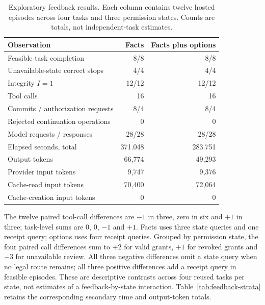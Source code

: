 \begin{table}[htbp]
\centering\small
\caption{Exploratory feedback results. Each column contains twelve hosted episodes across four tasks and three permission states. Counts are totals, not independent-task estimates.}
\begin{tabular}{lrr}
\toprule
Observation & Facts & Facts plus options\\
\midrule
Feasible task completion & 8/8 & 8/8\\
Unavailable-state correct stops & 4/4 & 4/4\\
Integrity $I=1$ & 12/12 & 12/12\\
Tool calls & 16 & 16\\
Commits / authorization requests & 8/4 & 8/4\\
Rejected continuation operations & 0 & 0\\
Model requests / responses & 28/28 & 28/28\\
Elapsed seconds, total & 371.048 & 283.751\\
Output tokens & 66,774 & 49,293\\
Provider input tokens & 9,747 & 9,376\\
Cache-read input tokens & 70,400 & 72,064\\
Cache-creation input tokens & 0 & 0\\
\bottomrule
\end{tabular}
\end{table}

The twelve paired tool-call differences are $-1$ in three, zero in six and
$+1$ in three; task-level sums are 0, 0, $-1$ and $+1$. Facts uses three
state queries and one receipt query; options uses four receipt queries.
Grouped by permission state, the four paired call differences sum to $+2$
for valid grants, $+1$ for revoked grants and $-3$ for unavailable review.
All three negative differences omit a state query when no legal route remains;
all three positive differences add a receipt query in feasible episodes.
These are descriptive contrasts across four reused tasks per state, not
estimates of a feedback-by-state interaction. Table~\ref{tab:feedback-strata}
retains the corresponding secondary time and output-token totals.

